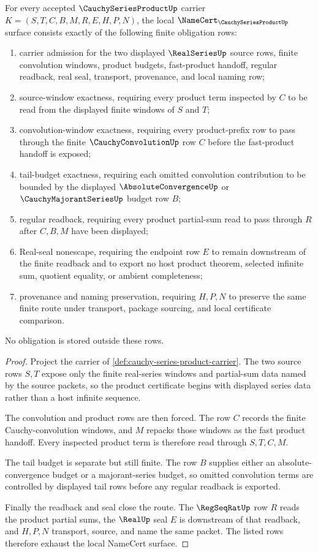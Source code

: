 \begin{theorem}
\label{thm:cauchy-series-product-namecert-obligations}
For every accepted $\CauchySeriesProductUp$ carrier $K=(S,T,C,B,M,R,E,H,P,N)$, the local $\NameCert_{\CauchySeriesProductUp}$ surface consists exactly of the following finite obligation rows:
\begin{enumerate}
\item carrier admission for the two displayed $\RealSeriesUp$ source rows, finite convolution windows, product budgets, fast-product handoff, regular readback, real seal, transport, provenance, and local naming row;
\item source-window exactness, requiring every product term inspected by $C$ to be read from the displayed finite windows of $S$ and $T$;
\item convolution-window exactness, requiring every product-prefix row to pass through the finite $\CauchyConvolutionUp$ row $C$ before the fast-product handoff is exposed;
\item tail-budget exactness, requiring each omitted convolution contribution to be bounded by the displayed $\AbsoluteConvergenceUp$ or $\CauchyMajorantSeriesUp$ budget row $B$;
\item regular readback, requiring every product partial-sum read to pass through $R$ after $C,B,M$ have been displayed;
\item Real-seal nonescape, requiring the endpoint row $E$ to remain downstream of the finite readback and to export no host product theorem, selected infinite sum, quotient equality, or ambient completeness;
\item provenance and naming preservation, requiring $H,P,N$ to preserve the same finite route under transport, package sourcing, and local certificate comparison.
\end{enumerate}
No obligation is stored outside these rows.
\end{theorem}
\begin{proof}
Project the carrier of \autoref{def:cauchy-series-product-carrier}. The two source rows $S,T$ expose only the finite real-series windows and partial-sum data named by the source packets, so the product certificate begins with displayed series data rather than a host infinite sequence.

The convolution and product rows are then forced. The row $C$ records the finite Cauchy-convolution windows, and $M$ repacks those windows as the fast product handoff. Every inspected product term is therefore read through $S,T,C,M$.

The tail budget is separate but still finite. The row $B$ supplies either an absolute-convergence budget or a majorant-series budget, so omitted convolution terms are controlled by displayed tail rows before any regular readback is exported.

Finally the readback and seal close the route. The $\RegSeqRatUp$ row $R$ reads the product partial sums, the $\RealUp$ seal $E$ is downstream of that readback, and $H,P,N$ transport, source, and name the same packet. The listed rows therefore exhaust the local NameCert surface.
\end{proof}

